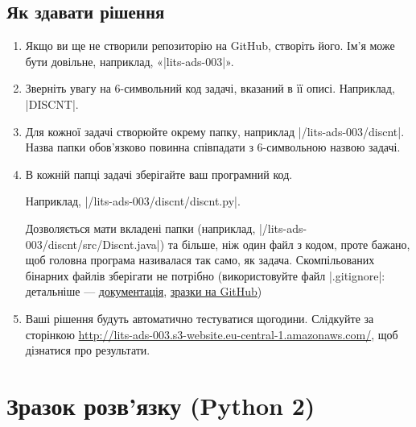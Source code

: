 \documentclass[12pt,a4paper]{article}
\begin{document}
\subsection*{Як здавати рішення}

\begin{enumerate}
    \item Якщо ви ще не створили репозиторію на GitHub, створіть його. Ім’я може бути довільне, наприклад, «|lits-ads-003|».
    \item Зверніть увагу на 6-символьний код задачі, вказаний в її описі. Наприклад, |DISCNT|.
    \item Для кожної задачі створюйте окрему папку, наприклад |/lits-ads-003/discnt|. Назва папки обов’язково повинна співпадати з 6-символьною назвою задачі.
    \item В кожній папці задачі зберігайте ваш програмний код.

    Наприклад, |/lits-ads-003/discnt/discnt.py|.

    Дозволяється мати вкладені папки (наприклад, |/lits-ads-003/discnt/src/Discnt.java|) та більше, ніж один файл з кодом, проте бажано, щоб головна програма називалася так само, як задача. Скомпільованих бінарних файлів зберігати не потрібно (використовуйте файл |.gitignore|: детальніше --- \href{http://git-scm.com/docs/gitignore}{документація}, \href{https://github.com/github/gitignore}{зразки на GitHub})

    \item Ваші рішення будуть автоматично тестуватися щогодини. Слідкуйте за сторінкою \href{http://lits-ads-003.s3-website.eu-central-1.amazonaws.com/}{http://lits-ads-003.s3-website.eu-central-1.amazonaws.com/}, щоб дізнатися про результати.
\end{enumerate}


\pagebreak





\pagebreak


\section*{Зразок розв’язку (Python 2)}



\end{document}
